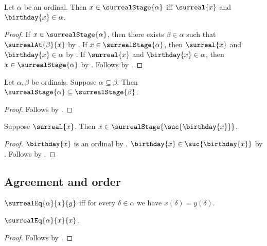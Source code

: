 \begin{proposition}\label{surreal_stage_characterization}
    Let $\alpha$ be an ordinal.
    Then $x\in\surrealStage{\alpha}$ iff
        $\surreal{x}$ and $\birthday{x}\in\alpha$.
\end{proposition}
\begin{proof}
    If $x\in\surrealStage{\alpha}$, then there exists
        $\beta\in\alpha$ such that $\surrealAt{\beta}{x}$
        by .
    If $x\in\surrealStage{\alpha}$, then
        $\surreal{x}$ and $\birthday{x}\in\alpha$
        by .
    If $\surreal{x}$ and $\birthday{x}\in\alpha$, then
        $x\in\surrealStage{\alpha}$
        by .
    Follows by \auto.
\end{proof}

\begin{proposition}\label{surreal_stage_monotone}
    Let $\alpha,\beta$ be ordinals.
    Suppose $\alpha\subseteq\beta$.
    Then $\surrealStage{\alpha}\subseteq\surrealStage{\beta}$.
\end{proposition}
\begin{proof}
    Follows by
        .
\end{proof}

\begin{proposition}\label{surreal_in_successor_stage}
    Suppose $\surreal{x}$.
    Then $x\in\surrealStage{\suc{\birthday{x}}}$.
\end{proposition}
\begin{proof}
    $\birthday{x}$ is an ordinal
        by .
    $\birthday{x}\in\suc{\birthday{x}}$
        by .
    Follows by .
\end{proof}

\subsection{Agreement and order}

\begin{definition}\label{surreal_eq_initial}
    $\surrealEq{\alpha}{x}{y}$ iff
        for every $\delta\in\alpha$ we have $x(\delta)=y(\delta)$.
\end{definition}

\begin{proposition}\label{surreal_eq_initial_reflexive}
    $\surrealEq{\alpha}{x}{x}$.
\end{proposition}
\begin{proof}
    Follows by .
\end{proof}

